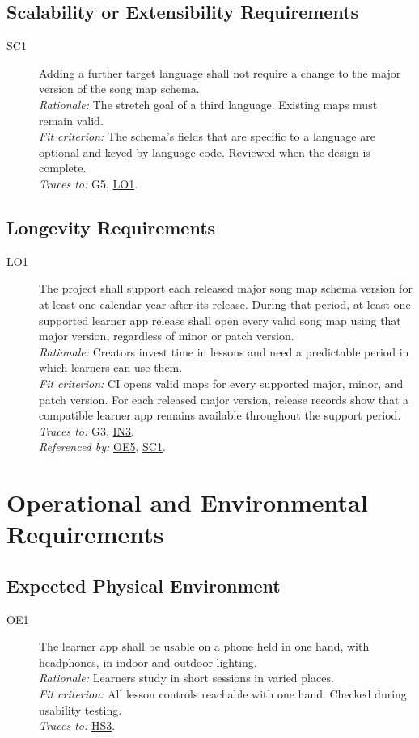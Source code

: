 \documentclass[12pt]{article}
\newcommand{\rat}[1]{\\\textit{Rationale:} #1}
\newcommand{\fit}[1]{\\\textit{Fit criterion:} #1}
\newcommand{\trace}[1]{\\\textit{Traces to:} #1}
\newcommand{\usedby}[1]{\\\textit{Referenced by:} #1}
\newcommand{\reqdef}[1]{\hypertarget{req:#1}{#1}}
\newcommand{\req}[1]{\hyperlink{req:#1}{#1}}
\begin{document}
\subsection{Scalability or Extensibility Requirements}
\begin{description}
\item[\reqdef{SC1}] Adding a further target language shall not require a change to the
major version of the song map schema.
\rat{The stretch goal of a third language. Existing maps must remain valid.}
\fit{The schema's fields that are specific to a language are optional and keyed by language
code. Reviewed when the design is complete.}
\trace{G5, \req{LO1}.}
\end{description}

\subsection{Longevity Requirements}
\begin{description}
\item[\reqdef{LO1}] The project shall support each released major song map
schema version for at least one calendar year after its release.
During that period, at least one supported learner app release shall open every
valid song map using that major version, regardless of minor or patch version.
\rat{Creators invest time in lessons and need a predictable period in which
learners can use them.}
\fit{CI opens valid maps for every supported major, minor, and patch version.
For each released major version, release records show that a compatible learner
app remains available throughout the support period.}
\trace{G3, \req{IN3}.}
\usedby{\req{OE5}, \req{SC1}.}
\end{description}

\section{Operational and Environmental Requirements}
\subsection{Expected Physical Environment}
\begin{description}
\item[\reqdef{OE1}] The learner app shall be usable on a phone held in one hand, with
headphones, in indoor and outdoor lighting.
\rat{Learners study in short sessions in varied places.}
\fit{All lesson controls reachable with one hand. Checked during usability
testing.}
\trace{\req{HS3}.}
\end{description}
\end{document}
